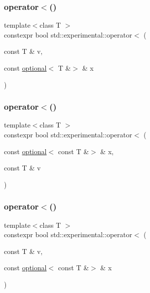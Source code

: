 \mbox{\label{namespacestd_1_1experimental_ae8fc20bba7e30d2ad7bc8646ec1de715}} 
\subsubsection{\texorpdfstring{operator$<$()}{operator<()}\hspace{0.1cm}{\footnotesize\ttfamily [7/9]}}
{\footnotesize\ttfamily template$<$class T $>$ \\
constexpr bool std\+::experimental\+::operator$<$ (\begin{DoxyParamCaption}\item[{const T \&}]{v,  }\item[{const \hyperlink{classstd_1_1experimental_1_1optional}{optional}$<$ T \&$>$ \&}]{x }\end{DoxyParamCaption})}

\mbox{\label{namespacestd_1_1experimental_afd3f43608dc3267d32ee592ae88fba55}} 
\subsubsection{\texorpdfstring{operator$<$()}{operator<()}\hspace{0.1cm}{\footnotesize\ttfamily [8/9]}}
{\footnotesize\ttfamily template$<$class T $>$ \\
constexpr bool std\+::experimental\+::operator$<$ (\begin{DoxyParamCaption}\item[{const \hyperlink{classstd_1_1experimental_1_1optional}{optional}$<$ const T \&$>$ \&}]{x,  }\item[{const T \&}]{v }\end{DoxyParamCaption})}

\mbox{\label{namespacestd_1_1experimental_a3905d16fb3b1c1627ff2082e6159d4fb}} 
\subsubsection{\texorpdfstring{operator$<$()}{operator<()}\hspace{0.1cm}{\footnotesize\ttfamily [9/9]}}
{\footnotesize\ttfamily template$<$class T $>$ \\
constexpr bool std\+::experimental\+::operator$<$ (\begin{DoxyParamCaption}\item[{const T \&}]{v,  }\item[{const \hyperlink{classstd_1_1experimental_1_1optional}{optional}$<$ const T \&$>$ \&}]{x }\end{DoxyParamCaption})}

